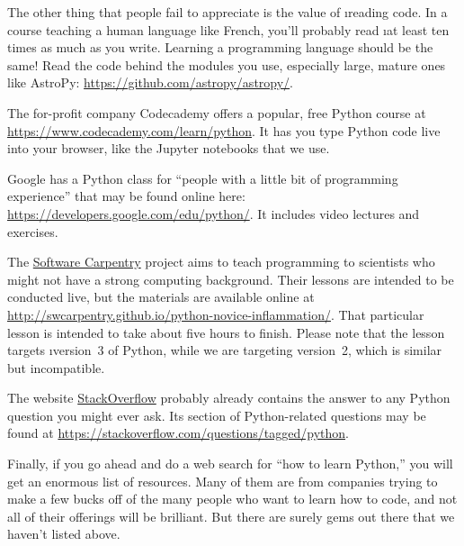\documentclass[letterpaper, 12pt, titlepage, twoside]{article}
\begin{document}
The other thing that people fail to appreciate is the value of \i{reading
  code}. In a course teaching a human language like French, you'll probably
read \i{at least} ten times as much as you write. Learning a programming
language should be the same! Read the code behind the modules you use,
especially large, mature ones like AstroPy:
\url{https://github.com/astropy/astropy/}.

The for-profit company Codecademy offers a popular, free Python course at
\url{https://www.codecademy.com/learn/python}. It has you type Python code
live into your browser, like the Jupyter notebooks that we use.

Google has a Python class for ``people with a little bit of programming
experience'' that may be found online here:
\url{https://developers.google.com/edu/python/}. It includes video lectures
and exercises.

The \href{https://software-carpentry.org/}{Software Carpentry} project aims to
teach programming to scientists who might not have a strong computing
background. Their lessons are intended to be conducted live, but the materials
are available online at
\url{http://swcarpentry.github.io/python-novice-inflammation/}. That
particular lesson is intended to take about five hours to finish. Please note
that the lesson targets \i{version~3} of Python, while we are targeting
version~2, which is similar but incompatible.

The website \href{https://stackoverflow.com/}{StackOverflow} probably already
contains the answer to any Python question you might ever ask. Its section of
Python-related questions may be found at
\url{https://stackoverflow.com/questions/tagged/python}.

Finally, if you go ahead and do a web search for ``how to learn Python,'' you
will get an enormous list of resources. Many of them are from companies trying
to make a few bucks off of the many people who want to learn how to code, and
not all of their offerings will be brilliant. But there are surely gems out
there that we haven't listed above.
\end{document}
